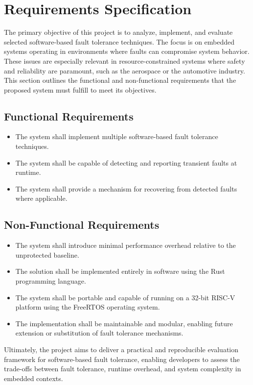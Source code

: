\clearpage
\section{Requirements Specification}

The primary objective of this project is to analyze, implement, and evaluate selected software-based fault tolerance techniques. The focus is on embedded systems operating in environments where faults can compromise system behavior. These issues are especially relevant in resource-constrained systems where safety and reliability are paramount, such as the aerospace or the automotive industry.
This section outlines the functional and non-functional requirements that the proposed system must fulfill to meet its objectives.

\subsection*{Functional Requirements}
\begin{itemize}
\item The system shall implement multiple software-based fault tolerance techniques.
\item The system shall be capable of detecting and reporting transient faults at runtime.
\item The system shall provide a mechanism for recovering from detected faults where applicable.
\end{itemize}

\subsection*{Non-Functional Requirements}
\begin{itemize}
\item The system shall introduce minimal performance overhead relative to the unprotected baseline.
\item The solution shall be implemented entirely in software using the Rust programming language.
\item The system shall be portable and capable of running on a 32-bit RISC-V platform using the FreeRTOS operating system.
\item The implementation shall be maintainable and modular, enabling future extension or substitution of fault tolerance mechanisms.
\end{itemize}

Ultimately, the project aims to deliver a practical and reproducible evaluation framework for software-based fault tolerance, enabling developers to assess the trade-offs between fault tolerance, runtime overhead, and system complexity in embedded contexts.